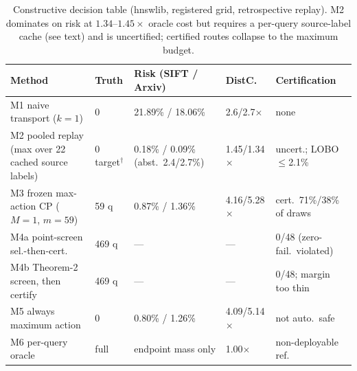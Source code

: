 \documentclass{article}
\begin{document}
\begin{table}[t]
\centering
\caption{Constructive decision table (hnswlib, registered grid, retrospective replay). M2 dominates on risk
at $1.34$--$1.45\times$ oracle cost but requires a per-query source-label cache (see text) and is
uncertified; certified routes collapse to the maximum budget.}
\label{tab:constructive}
\scriptsize
\setlength{\tabcolsep}{2.8pt}
\begin{tabular}{p{3.2cm}p{1.0cm}p{3.0cm}p{1.4cm}p{4.0cm}}
\toprule
Method & Truth & Risk (SIFT / Arxiv) & DistC. & Certification \\
\midrule
M1 naive transport ($k{=}1$) & 0 & 21.89\% / 18.06\% & 2.6/2.7$\times$ & none \\
M2 pooled replay (max over 22 cached source labels) & 0 target$^{\dagger}$ & 0.18\% / 0.09\% (abst.\ 2.4/2.7\%) & 1.45/1.34$\times$ & uncert.; LOBO $\le$2.1\% \\
M3 frozen max-action CP ($M{=}1$, $m{=}59$) & 59 q & 0.87\% / 1.36\% & 4.16/5.28$\times$ & cert.\ 71\%/38\% of draws \\
M4a point-screen sel.-then-cert. & 469 q & --- & --- & 0/48 (zero-fail.\ violated) \\
M4b Theorem-2 screen, then certify & 469 q & --- & --- & 0/48; margin too thin \\
M5 always maximum action & 0 & 0.80\% / 1.26\% & 4.09/5.14$\times$ & not auto.\ safe \\
M6 per-query oracle & full & endpoint mass only & 1.00$\times$ & non-deployable ref. \\
\bottomrule
\end{tabular}
\end{table}
\end{document}
